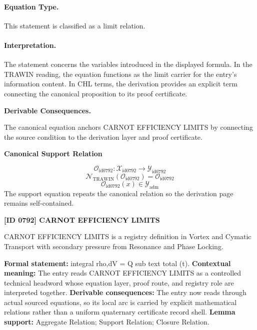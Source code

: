 \paragraph{Equation Type.}
This statement is classified as a limit relation.

\paragraph{Interpretation.}
The statement concerns the variables introduced in the displayed formula. In the TRAWIN reading, the equation functions as the limit carrier for the entry’s information content. In CHL terms, the derivation provides an explicit term connecting the canonical proposition to its proof certificate.

\par\vspace{0.35em}
\noindent\textbf{Derivable Consequences.}\quad
\begingroup
\footnotesize
\raggedright
The canonical equation anchors CARNOT EFFICIENCY LIMITS by connecting the source condition to the derivation layer and proof certificate.
\par\endgroup

\noindent\textbf{Canonical Support Relation}\par
\[
\mathcal{O}_{\mathrm{id0792}}:\mathcal{X}_{\mathrm{id0792}}\longrightarrow\mathcal{Y}_{\mathrm{id0792}}
\]
\[
\mathcal{N}_{\mathrm{TRAWIN}}(\mathcal{O}_{\mathrm{id0792}})=\mathcal{O}_{\mathrm{id0792}}
\]
\[
\mathcal{O}_{\mathrm{id0792}}(x)\in\mathcal{Y}_{\mathrm{adm}}
\]
\noindent The support equation repeats the canonical relation so the derivation page remains self-contained.\par

\clearpage
\noindent\textbf{[ID 0792] CARNOT EFFICIENCY LIMITS}\par
\vspace{0.35em}
\begingroup\small
{}
CARNOT EFFICIENCY LIMITS is a registry definition in Vortex and Cymatic Transport with secondary pressure from Resonance and Phase Locking.

\begingroup\footnotesize\setlength{\emergencystretch}{3em}\sloppy
\textbf{Formal statement:} integral rho,dV = Q sub text total (t). \textbf{Contextual meaning:} The entry reads CARNOT EFFICIENCY LIMITS as a controlled technical headword whose equation layer, proof route, and registry role are interpreted together. \textbf{Derivable consequences:} The entry now reads through actual sourced equations, so its local arc is carried by explicit mathematical relations rather than a uniform quaternary certificate record shell. \textbf{Lemma support:} Aggregate Relation; Support Relation; Closure Relation.\par
\endgroup

